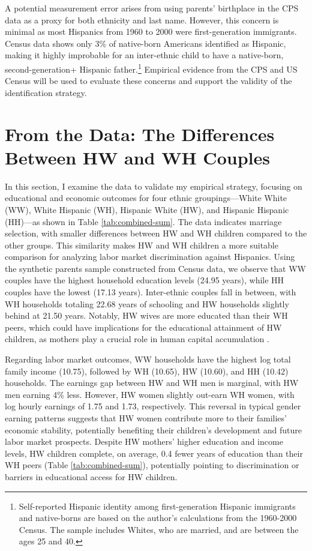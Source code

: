 \documentclass[a4paper,fleqn]{cas-sc}
\begin{document}
A potential measurement error arises from using parents' birthplace in the CPS data as a proxy for both ethnicity and last name. However, this concern is minimal as most Hispanics from 1960 to 2000 were first-generation immigrants. Census data shows only 3\% of native-born Americans identified as Hispanic, making it highly improbable for an inter-ethnic child to have a native-born, second-generation+ Hispanic father.\footnote{Self-reported Hispanic identity among first-generation Hispanic immigrants and native-borns are based on the author’s calculations from the 1960-2000 Census. The sample includes Whites, who are married, and are between the ages 25 and 40.} Empirical evidence from the CPS and US Census will be used to evaluate these concerns and support the validity of the identification strategy.

\section{From the Data: The Differences Between HW and WH Couples}\label{sec:hw-wh-couples-data}

In this section, I examine the data to validate my empirical strategy, focusing on educational and economic outcomes for four ethnic groupings—White White (WW), White Hispanic (WH), Hispanic White (HW), and Hispanic Hispanic (HH)—as shown in Table \ref{tab:combined-sum}. The data indicates marriage selection, with smaller differences between HW and WH children compared to the other groups. This similarity makes HW and WH children a more suitable comparison for analyzing labor market discrimination against Hispanics. Using the synthetic parents sample constructed from Census data, we observe that WW couples have the highest household education levels (24.95 years), while HH couples have the lowest (17.13 years). Inter-ethnic couples fall in between, with WH households totaling 22.68 years of schooling and HW households slightly behind at 21.50 years. Notably, HW wives are more educated than their WH peers, which could have implications for the educational attainment of HW children, as mothers play a crucial role in human capital accumulation \citep{kimball2009risk,magruder2010intergenerational}.

Regarding labor market outcomes, WW households have the highest log total family income (10.75), followed by WH (10.65), HW (10.60), and HH (10.42) households. The earnings gap between HW and WH men is marginal, with HW men earning 4\% less. However, HW women slightly out-earn WH women, with log hourly earnings of 1.75 and 1.73, respectively. This reversal in typical gender earning patterns suggests that HW women contribute more to their families' economic stability, potentially benefiting their children's development and future labor market prospects. Despite HW mothers' higher education and income levels, HW children complete, on average, 0.4 fewer years of education than their WH peers (Table \ref{tab:combined-sum}), potentially pointing to discrimination or barriers in educational access for HW children.
\end{document}
